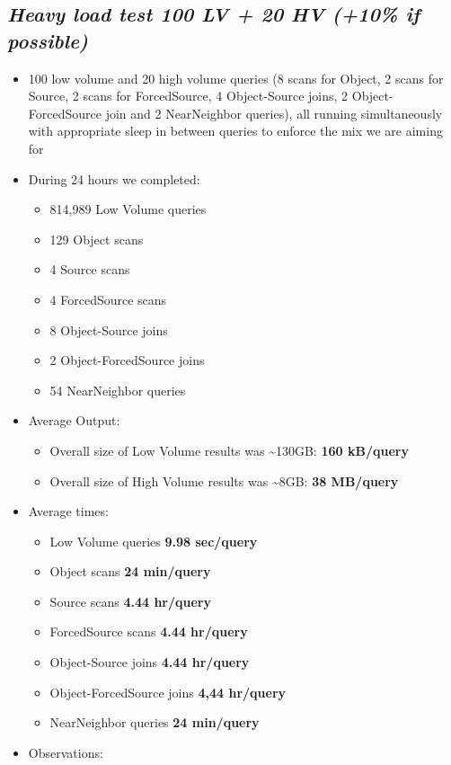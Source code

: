 \documentclass[DM,toc]{lsstdoc}
\begin{document}
\subsection{\emph{Heavy load test 100 LV + 20
HV (+10\% if
possible)}}\label{heavy-load-test-100-lv-20-hv-10-if-possible}

\begin{itemize}
\item
  100 low volume and 20 high volume queries (8 scans for Object, 2 scans
  for Source, 2 scans for ForcedSource, 4 Object-Source joins, 2
  Object-ForcedSource join and 2 NearNeighbor queries), all running
  simultaneously with appropriate sleep in between queries to enforce
  the mix we are aiming for
\item
  During 24 hours we completed:

  \begin{itemize}
  \item
    814,989 Low Volume queries
  \item
    129 Object scans
  \item
    4 Source scans
  \item
    4 ForcedSource scans
  \item
    8 Object-Source joins
  \item
    2 Object-ForcedSource joins
  \item
    54 NearNeighbor queries
  \end{itemize}
\item
  Average Output:

  \begin{itemize}
  \item
    Overall size of Low Volume results was
    \textasciitilde{}130GB: \textbf{160 kB/query}
  \item
    Overall size of High Volume results was \textasciitilde{}8GB:
    \textbf{38 MB/query}
  \end{itemize}
\item
  Average times:

  \begin{itemize}
  \item
    Low Volume queries \textbf{9.98 sec/query}
  \item
    Object scans \textbf{24 min/query}
  \item
    Source scans \textbf{4.44 hr/query}
  \item
    ForcedSource scans \textbf{4.44 hr/query}
  \item
    Object-Source joins \textbf{4.44 hr/query}
  \item
    Object-ForcedSource joins \textbf{4,44 hr/query}
  \item
    NearNeighbor queries \textbf{24 min/query}
  \end{itemize}
\item
  Observations:


\end{itemize}
\end{document}
